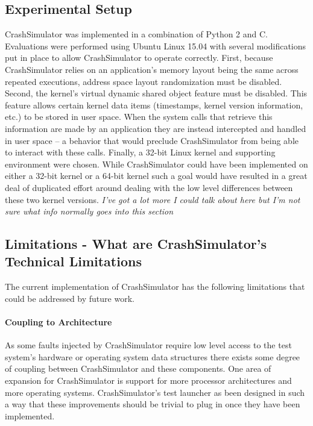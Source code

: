     \subsection{Experimental Setup}

    CrashSimulator was implemented in a combination of Python 2 and C.  Evaluations were performed using Ubuntu Linux
    15.04 with several modifications put in place to allow CrashSimulator to operate correctly. First, because
    CrashSimulator relies on an application's memory layout being the same across repeated executions, address space
    layout randomization must be disabled.  Second, the kernel's virtual dynamic shared object feature must be
    disabled.  This feature allows certain kernel data items (timestamps, kernel version information, etc.) to be stored
    in user space.  When the system calls that retrieve this information are made by an application they are instead
    intercepted and handled in user space -- a behavior that would preclude CrashSimulator from being able to interact
    with these calls.  Finally, a 32-bit Linux kernel and supporting environment were chosen.  While CrashSimulator
    could have been implemented on either a 32-bit kernel or a 64-bit kernel such a goal would have resulted in a great
    deal of duplicated effort around dealing with the low level differences between these two kernel versions.
    \emph{I've got a lot more I could talk about here but I'm not sure what info normally goes into this section}


    \subsection{Limitations - What are CrashSimulator's Technical Limitations}

        The current implementation of CrashSimulator has the following limitations that could be addressed by future work.

        \paragraph{Coupling to Architecture}

        As some faults injected by CrashSimulator require low level access to the test system's hardware or operating
        system data structures there exists some degree of coupling between CrashSimulator and these components. One
        area of expansion for CrashSimulator is support for more processor architectures and more operating systems.
        CrashSimulator's test launcher as been designed in such a way that these improvements should be trivial to plug
        in once they have been implemented.

